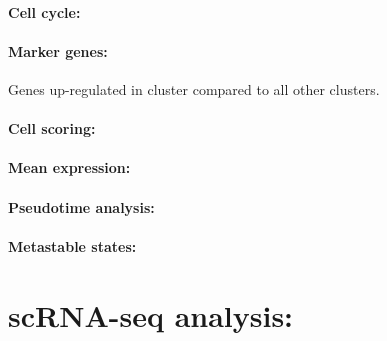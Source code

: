 \documentclass[a4paper,12pt]{article}
\begin{document}
\paragraph{Cell cycle:}
\paragraph{Marker genes:} Genes up-regulated in cluster compared to all other clusters.
\paragraph{Cell scoring:}
\paragraph{Mean expression:}
\paragraph{Pseudotime analysis:}
\paragraph{Metastable states:}








\section{scRNA-seq analysis:}
\end{document}
